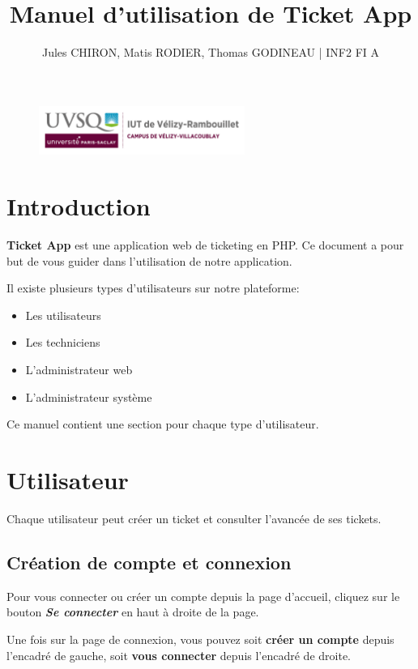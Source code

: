 \documentclass[12pt, a4paper]{article}
\title{Manuel d'utilisation de \textbf{Ticket App}}
\author{Jules CHIRON, Matis RODIER, Thomas GODINEAU | INF2 FI A}
\begin{document}
\maketitle

\begin{figure}[h]
    \includegraphics[width=0.6\textwidth]{annexes/logo_uvsq}
\end{figure}

\tableofcontents{}

\section*{Introduction}

\textbf{Ticket App} est une application web de ticketing en PHP.\@
Ce document a pour but de vous guider dans l'utilisation de notre application.

\bigskip
\noindent Il existe plusieurs types d'utilisateurs sur notre plateforme:
\begin{itemize}
    \item Les utilisateurs
    \item Les techniciens
    \item L'administrateur web
    \item L'administrateur système
\end{itemize}

\bigskip
\noindent Ce manuel contient une section pour chaque type d'utilisateur.

\section{Utilisateur}

Chaque utilisateur peut créer un ticket et consulter l'avancée de ses tickets.

\subsection*{Création de compte et connexion}

Pour vous connecter ou créer un compte depuis la page d'accueil, cliquez sur le bouton \textit{\textbf{Se connecter}} en haut à droite de la page.

\noindent Une fois sur la page de connexion, vous pouvez soit \textbf{créer un compte} depuis l'encadré de gauche,
soit \textbf{vous connecter} depuis l'encadré de droite.
\end{document}
